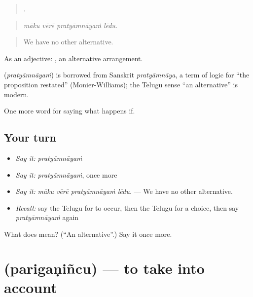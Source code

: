 \begin{quote}
   .
\end{quote}

\begin{quote}
\emph{māku vērē pratyāmnāyaṁ lēdu.}
\end{quote}

\begin{quote}
We have no other alternative.
\end{quote}

As an adjective:  , an alternative arrangement.

\begin{cousinweb}
\textbf{} (\emph{pratyāmnāyaṁ}) is borrowed from Sanskrit \emph{pratyāmnāya}, a term of logic for \textquotedblleft{}the proposition restated\textquotedblright{} (Monier-Williams); the Telugu sense \textquotedblleft{}an alternative\textquotedblright{} is modern.
\end{cousinweb}

\begin{grammarlens}[title={What you've built}]
One more word for saying what happens if.
\end{grammarlens}

\subsection*{Your turn}
\begin{itemize}
\raggedright
  \item \emph{Say it:} \emph{pratyāmnāyaṁ}
  \item \emph{Say it:} \emph{pratyāmnāyaṁ}, once more
  \item \emph{Say it:} \emph{māku vērē pratyāmnāyaṁ lēdu.} — We have no other alternative.
  \item \emph{Recall:} say the Telugu for to occur, then the Telugu for a choice, then say \emph{pratyāmnāyaṁ} again
\end{itemize}

\begin{tcolorbox}[breakable,colback=teal!4,colframe=teal!35!black,title={Before you move on}]
What does  mean? (\textquotedblleft{}An alternative\textquotedblright{}.) Say it once more.
\end{tcolorbox}
\section[\texorpdfstring{\te{పరిగణించు} (parigaṇiñcu)}{పరిగణించు (parigaṇiñcu)}]{ (parigaṇiñcu) — to take into account}


